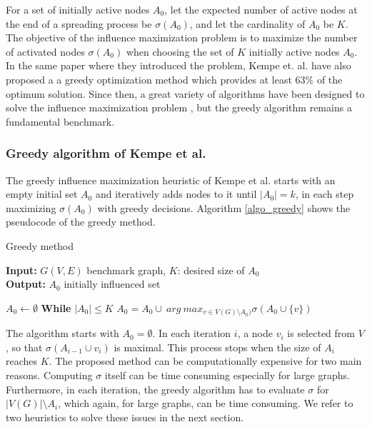 \documentclass[pdflatex,sn-mathphys-ay]{sn-jnl}
\begin{document}
For a set of initially active nodes $A_0$, let the expected number of active nodes at the end of a spreading process be $\sigma(A_0)$, and let the cardinality of $A_0$ be $K$. The objective of the influence maximization problem is to maximize the number of activated nodes $\sigma(A_0)$ when choosing the set of $K$ initially active nodes $A_0$. In the same paper where they introduced the problem, Kempe et. al. have also proposed a a greedy optimization method which provides at least 63\% of the optimum solution. Since then, a great variety of algorithms have been designed to solve the influence maximization problem \citep{lisurvey}, but the greedy algorithm remains a fundamental benchmark.



\subsubsection{Greedy algorithm of Kempe et al.}\label{subsec_greedy}

The greedy influence maximization heuristic of Kempe et al. \citep{kempe} starts with an empty initial set $A_0$ and iteratively adds nodes to it until $|A_0| = k$, in each step maximizing $\sigma(A_0)$ with greedy decisions. Algorithm \ref{algo_greedy} shows the pseudocode of the greedy method.

\begin{algorithm}[ht]
\caption{Greedy method}
\label{algo_greedy}
\textbf{Input:} $G(V,E)$ benchmark graph, $K$: desired size of $A_0$
\\
\textbf{Output:} $A_{0}$ initially influenced set
\begin{algorithmic}[1]
    \State $A_0 \leftarrow \emptyset$
    \State \textbf{While} $|A_{0}| \leq K$
    \State \hspace{\algorithmicindent} $A_{0}=A_{0} \cup \ arg \ max_{v \in V(G) \setminus A_{0})} \sigma(A_{0} \cup \{v\})$
\end{algorithmic}
\end{algorithm}

The algorithm starts with $A_0 = \emptyset$. In each iteration $i$, a node $v_i$ is selected from $V$, so that $\sigma(A_{i-1} \cup {v_i})$ is maximal. This process stops when the size of $A_i$ reaches $K$. The proposed method can be computationally expensive for two main reasons. Computing $\sigma$ itself can be time consuming especially for large graphs. Furthermore, in each iteration, the greedy algorithm has to evaluate $\sigma$ for $|V(G)| \setminus A_i$, which again, for large graphs, can be time consuming. We refer to two heuristics to solve these issues in the next section.
\end{document}
